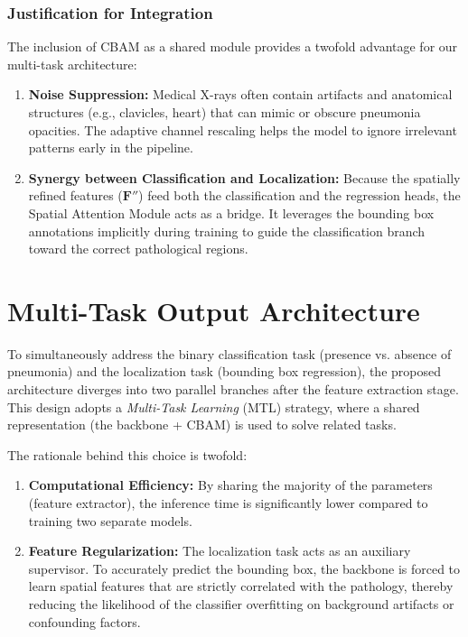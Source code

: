 \documentclass[a4paper,fleqn]{cas-dc}
\begin{document}
\subsubsection{Justification for Integration}The inclusion of CBAM as a shared module provides a twofold advantage for our multi-task architecture:
\begin{enumerate}
	\item \textbf{Noise Suppression:} Medical X-rays often contain artifacts and anatomical structures (e.g., clavicles, heart) that can mimic or obscure pneumonia opacities. The adaptive channel rescaling helps the model to ignore irrelevant patterns early in the pipeline.
	\item \textbf{Synergy between Classification and Localization:} Because the spatially refined features ($\mathbf{F}''$) feed both the classification and the regression heads, the Spatial Attention Module acts as a bridge. It leverages the bounding box annotations implicitly during training to guide the classification branch toward the correct pathological regions.
\end{enumerate}

\section{Multi-Task Output Architecture}

To simultaneously address the binary classification task (presence vs. absence of pneumonia) and the localization task (bounding box regression), the proposed architecture diverges into two parallel branches after the feature extraction stage. This design adopts a \textit{Multi-Task Learning} (MTL) strategy, where a shared representation (the backbone + CBAM) is used to solve related tasks.

The rationale behind this choice is twofold:
\begin{enumerate}
	\item \textbf{Computational Efficiency:} By sharing the majority of the parameters (feature extractor), the inference time is significantly lower compared to training two separate models.
	\item \textbf{Feature Regularization:} The localization task acts as an auxiliary supervisor. To accurately predict the bounding box, the backbone is forced to learn spatial features that are strictly correlated with the pathology, thereby reducing the likelihood of the classifier overfitting on background artifacts or confounding factors.
\end{enumerate}
\end{document}
